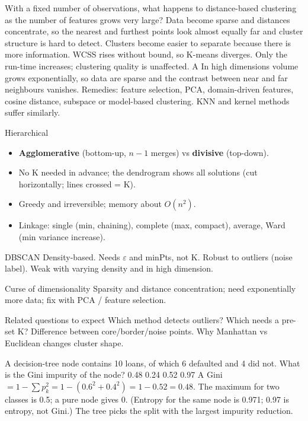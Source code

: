 {With a fixed number of observations, what happens to distance-based clustering as the number of features grows very large?}
{Data become sparse and distances concentrate, so the nearest and furthest points look almost equally far and cluster structure is hard to detect.}
{Clusters become easier to separate because there is more information.}
{WCSS rises without bound, so K-means diverges.}
{Only the run-time increases; clustering quality is unaffected.}
{A}
{In high dimensions volume grows exponentially, so data are sparse and the contrast between near and far neighbours vanishes. Remedies: feature selection, PCA, domain-driven features, cosine distance, subspace or model-based clustering. KNN and kernel methods suffer similarly.}

{\begin{block}{Hierarchical}
		\begin{itemize}
			\item \textbf{Agglomerative} (bottom-up, $n-1$ merges) vs \textbf{divisive} (top-down).
			\item No K needed in advance; the dendrogram shows all solutions (cut horizontally; lines crossed = K).
			\item Greedy and irreversible; memory about $O(n^2)$.
			\item Linkage: single (min, chaining), complete (max, compact), average, Ward (min variance increase).
\end{itemize}\end{block}}
{\begin{block}{DBSCAN}
		Density-based. Needs $\varepsilon$ and minPts, not K. Robust to outliers (noise label). Weak with varying density and in high dimension.
	\end{block}
	\begin{block}{Curse of dimensionality}
		Sparsity and distance concentration; need exponentially more data; fix with PCA / feature selection.
	\end{block}
	\begin{alertblock}{Related questions to expect}
		Which method detects outliers? Which needs a pre-set K? Difference between core/border/noise points. Why Manhattan vs Euclidean changes cluster shape.
\end{alertblock}}

{A decision-tree node contains 10 loans, of which 6 defaulted and 4 did not. What is the Gini impurity of the node?}
{0.48}
{0.24}
{0.52}
{0.97}
{A}
{Gini $=1-\sum p_k^2=1-(0.6^2+0.4^2)=1-0.52=0.48$. The maximum for two classes is 0.5; a pure node gives 0. (Entropy for the same node is 0.971; 0.97 is entropy, not Gini.) The tree picks the split with the largest impurity reduction.}

